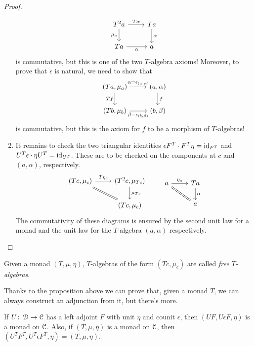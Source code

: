 \documentclass[a4paper,11pt,oneside,openany]{scrbook}
\begin{document}
\begin{proof}
\begin{enumerate}[label=(\roman*)]
		      \[
			      \begin{tikzcd}
				      T^2 a\ar["\mu_{a}"']{d}\ar["T\alpha"]{r}
				      & Ta\ar["\alpha"]{d} \\
				      Ta\ar["\alpha"']{r}
				      & a
			      \end{tikzcd}
		      \]
		      is commutative, but this is one of the two $T$-algebra axioms! Moreover, to prove that $\epsilon$ is natural, we need to show that
		      \[
			      \begin{tikzcd}
				      (Ta,\mu_a) \ar["Tf"']{d}\ar["\alpha=\epsilon_{(a,\alpha)}"]{r}
				      & (a,\alpha)\ar["f"]{d} \\
				      (Tb,\mu_b)\ar["\beta=\epsilon_{(b,\beta)}"']{r}
				      & (b,\beta)
			      \end{tikzcd}
		      \]
		      is commutative, but this is the axiom for $f$ to be a morphism of $T$-algebras!
		\item It remains to check the two triangular identities $\epsilon F^T \cdot F^T\eta=\operatorname{id}_{F^T}$ and $U^T\epsilon\cdot\eta U^T=\operatorname{id}_{U^T}$. These are to be checked on the components at $c$ and $(a, \alpha)$, respectively.
		      \[
			      \begin{tikzcd}
				      (Tc,\mu_c)\ar["T\eta_{c}",rightarrow]{r}\ar[equal]{dr}
				      & (T^2c,\mu_{Tc})\ar["\mu_{Tc}", rightarrow]{d}
				      \\
				      & (Tc,\mu_c)
			      \end{tikzcd}	\quad\quad
			      \begin{tikzcd}
				      a\ar["\eta_a",rightarrow]{r}\ar[equal]{dr}
				      & Ta\ar["\alpha", rightarrow]{d}
				      \\
				      & a
			      \end{tikzcd}
		      \]
		      The commutativity of these diagrams is ensured by the second unit law for a monad and the unit law for the $T$-algebra $(a,\alpha)$ respectively. \qedhere
	\end{enumerate}
\end{proof}
\begin{defn}
	Given a monad $(T,\mu,\eta)$, $T$-algebras of the form $(Tc, \mu_c)$ are called \emph{free $T$-algebras}.
\end{defn}
Thanks to the proposition above we can prove that, given a monad $T$, we can
always construct an adjunction from it, but there's more.
\begin{prop}
	If $U\colon\operatorname{\mathcal{D}}\to\operatorname{\mathcal{C}}$ has a left adjoint $F$ with unit $\eta$ and counit $\epsilon$, then $(UF,U\epsilon F,\eta)$ is a monad on $\operatorname{\mathcal{C}}$. Also, if $(T,\mu,\eta)$ is a monad on $\operatorname{\mathcal{C}}$, then $(U^TF^T,U^T\epsilon F^T,\eta)=(T,\mu,\eta)$.
\end{prop}
\end{document}
